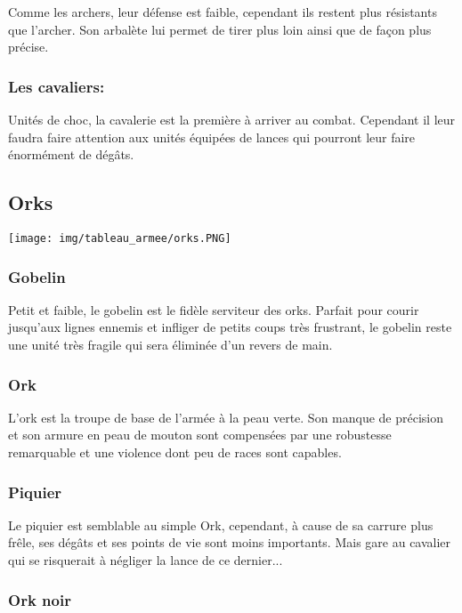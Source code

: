 \documentclass[a4paper]{article}
\begin{document}
	\quad Comme les archers, leur défense est faible, cependant ils restent plus résistants que l'archer. Son arbalète lui permet de tirer plus loin ainsi que de façon plus précise.
	
	\subsubsection{Les cavaliers: }
	
	\quad Unités de choc, la cavalerie est la première à arriver au combat. Cependant il leur faudra faire attention aux unités équipées de lances qui pourront leur faire énormément de dégâts.

	\newpage
\subsection{Orks}


	\texttt{[image: img/tableau\_armee/orks.PNG]}
	
	\subsubsection{Gobelin}
	
	\quad Petit et faible, le gobelin est le fidèle serviteur des orks. Parfait pour courir jusqu'aux lignes ennemis et infliger de petits coups très frustrant, le gobelin reste une unité très fragile qui sera éliminée d'un revers de main.

	\subsubsection{Ork}
	
	\quad L'ork est la troupe de base de l'armée à la peau verte. Son manque de précision et son armure en peau de mouton sont compensées par une robustesse remarquable et une violence dont peu de races sont capables.

	\subsubsection{Piquier}
	
	\quad Le piquier est semblable au simple Ork, cependant, à cause de sa carrure plus frêle, ses dégâts et ses points de vie sont moins importants. Mais gare au cavalier qui se risquerait à négliger la lance de ce dernier...

	\subsubsection{Ork noir}
	
\end{document}
